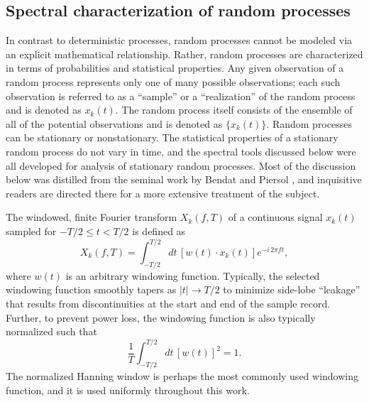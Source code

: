 \subsection{Spectral characterization of random processes}
\label{sec:ToroidalCorrelation:spectral_characterization_of_random_processes}
In contrast to deterministic processes,
random processes cannot be modeled via an explicit mathematical relationship.
Rather, random processes are characterized
in terms of probabilities and statistical properties.
Any given observation of a random process represents
only one of many possible observations;
each such observation is referred to as
a ``sample'' or a ``realization'' of the random process
and is denoted as $x_k(t)$.
The random process itself consists of
the ensemble of all of the potential observations
and is denoted as $\{x_k(t)\}$.
Random processes can be stationary or nonstationary.
The statistical properties of a stationary random process
do not vary in time, and
the spectral tools discussed below
were all developed for analysis of stationary random processes.
Most of the discussion below was distilled from
the seminal work by Bendat and Piersol \cite{bendat_and_piersol}, and
inquisitive readers are directed there
for a more extensive treatment of the subject.

The windowed, finite Fourier transform $X_k(f, T)$
of a continuous signal $x_k(t)$
sampled for $-T / 2 \leq t < T / 2$
is defined as
\begin{equation}
  X_k(f, T)
  =
  \int_{-T / 2}^{T / 2}
  dt \, [w(t) \cdot x_k(t)] e^{-i \, 2 \pi f t},
  \label{eq:ToroidalCorrelation:finite_Fourier_transform}
\end{equation}
where $w(t)$ is an arbitrary windowing function.
Typically, the selected windowing function smoothly tapers
as $|t| \rightarrow T / 2$
to minimize side-lobe ``leakage''
that results from discontinuities at the start and end of the sample record.
Further, to prevent power loss, the windowing function
is also typically normalized such that
\begin{equation}
  \frac{1}{T} \int_{-T/2}^{T/2} dt \, [w(t)]^2 = 1.
\end{equation}
The normalized Hanning window is perhaps
the most commonly used windowing function, and
it is used uniformly throughout this work.

